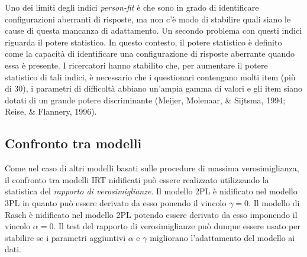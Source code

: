 Uno dei limiti degli indici {\it person-fit} è che sono in grado di identificare configurazioni aberranti di risposte, ma non c'è modo di stabilire quali siano le cause di questa mancanza di adattamento.  Un secondo problema con questi indici riguarda il potere statistico.  In questo contesto, il potere statistico è definito come la capacità di identificare una configurazione di risposte aberrante quando essa è presente. I ricercatori hanno stabilito che, per aumentare il potere statistico di tali indici, è necessario che i questionari contengano molti item (più di 30), i parametri di difficoltà abbiano un'ampia gamma di valori e gli item siano dotati di un grande potere discriminante (Meijer, Molenaar, \& Sijtsma, 1994; Reise, \& Flannery, 1996).


%
%

\subsection{Confronto tra modelli}

Come nel caso di altri modelli basati sulle procedure di massima verosimiglianza,  il confronto tra modelli IRT nidificati può essere realizzato utilizzando la statistica del \emph{rapporto di verosimiglianze}.  Il modello 2PL è nidificato nel modello 3PL in quanto può essere derivato da esso ponendo il vincolo $\gamma=0$.  Il modello di Rasch è nidificato nel modello 2PL potendo essere derivato da esso imponendo il vincolo $\alpha=0$.  Il test del rapporto di verosimiglianze può dunque essere usato per stabilire se i parametri aggiuntivi $\alpha$ e $\gamma$ migliorano l'adattamento del modello ai dati.

